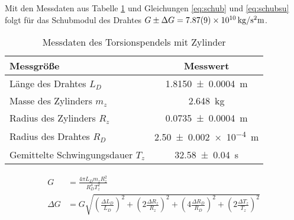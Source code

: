  Mit den Messdaten aus Tabelle \ref{tab:dataTZ} und Gleichungen \ref{eq:schub} und \ref{eq:schubsu} folgt für das Schubmodul  des Drahtes $G\pm \Delta G =\SI{7.87+-0.09e10}{kg \per \second \squared  \metre}$.
 
 
\begin{table}[h]
\centering	
\caption{Messdaten des Torsionspendels mit Zylinder  }
 \begin{tabular}{|l|c|} 
 	\hline 
 Messgröße	& Messwert  \\ 
 	\hline 
 	Länge des Drahtes $L_D$& \SI{1.8150\pm 0.0004 } {m} \\ 
 	\hline 
 	Masse des Zylinders $m_z$& \SI{2.648}{kg} \\ 
 	\hline 
 	Radius des Zylinders $R_z$ & \SI{0.0735 \pm 0.0004}{m}  \\ 
 	\hline 
 	Radius des Drahtes $R_D$ & \SI{2.50+-0.002 e-4} {m} \\ 
 	\hline 
 	Gemittelte Schwingungsdauer $T_z$&\SI{32.58+-0.04}{s}  \\ 
 	\hline 
 \end{tabular} 

	\label{tab:dataTZ}
\end{table} 




\begin{align}
	G&= \frac{4 \pi L_D m_z R_z^2}{R_D^4 T_z^2}
	\label{eq:schub}\\
	\Delta G &= G \sqrt{
		\left( \frac{\Delta L_D}{L_D} \right)^2+
		\left(2 \frac{\Delta R_z}{R_z} \right)^2+
		\left( 4 \frac{\Delta R_D}{R_D} \right)^2+
		\left( 2 \frac{\Delta T_z}{T_z} \right)^2 } \label{eq:schubsu}
\end{align}




